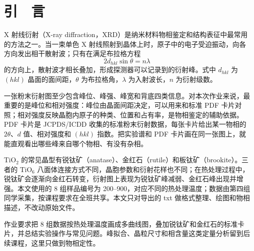\section{引　言}

X 射线衍射（X-ray diffraction，XRD）是纳米材料物相鉴定和结构表征中最常用的方法之一\cite{liang1991xray,cullity2001elements}。当一束单色 X 射线照射到晶体上时，原子中的电子受迫振动，向各方向发出相干散射波；只有在满足布拉格方程
\begin{equation}
2d_{hkl}\sin\theta=n\lambda
\label{eq:bragg}
\end{equation}
的方向上，散射波才相长叠加，形成探测器可以记录到的衍射峰。式中 $d_{hkl}$ 为 $(hkl)$ 晶面的面间距，$\theta$ 为布拉格角，$\lambda$ 为入射波长，$n$ 为衍射级数。

一张粉末衍射图至少包含峰位、峰强、峰宽和背底四类信息。对本次作业来说，最重要的是峰位和相对强度：峰位由晶面间距决定，可以用来和标准 PDF 卡片对照；相对强度反映晶胞内原子的种类、位置和占有率，是物相鉴定的辅助依据。PDF 卡片是 JCPDS/ICDD 收集的标准粉末衍射数据，每张卡片给出某一物相的 $2\theta$、$d$ 值、相对强度和 $(hkl)$ 指数\cite{pdf711167,pdf751756}。把实验谱和 PDF 卡片画在同一张图上，就能直观看出哪些峰来自哪个物相、有没有杂相。

TiO$_2$ 的常见晶型有锐钛矿（anatase）、金红石（rutile）和板钛矿（brookite）。三者的 TiO$_6$ 八面体连接方式不同，晶胞参数和衍射花样也不同；在热处理过程中，锐钛矿会逐渐向金红石转变，衍射图上表现为锐钛矿峰减弱、金红石峰出现并增强。本文使用的 8 组样品编号为 200--900，对应不同的热处理温度；数据由第四组同学采集，按课程要求在全班共享。本文只对导出的 txt 做格式整理、绘图和物相描述，不改动原始文件。

作业要求把 8 组数据按热处理温度画成多曲线图，叠加锐钛矿和金红石的标准卡片，并总结实验操作与常见问题。峰拟合、晶粒尺寸和相含量这类定量分析留到后续课程，这里只做到物相定性。
